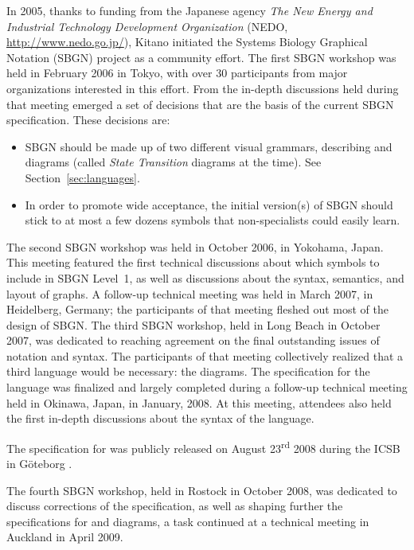 In 2005, thanks to funding from the Japanese agency \emph{The New Energy and Industrial Technology Development Organization} (NEDO, \url{http://www.nedo.go.jp/}), Kitano initiated the Systems Biology Graphical Notation (SBGN) project as a community effort.  The first SBGN workshop was held in February 2006 in Tokyo, with over 30 participants from major organizations interested in this effort.  From the in-depth discussions held during that meeting emerged a set of decisions that are the basis of the current SBGN specification.  These decisions are:

\begin{itemize}

\item SBGN should be made up of two different visual grammars, describing \ER{} and \PD{} diagrams (called \emph{State Transition} diagrams at the time).  See Section~\vref{sec:languages}.

\item In order to promote wide acceptance, the initial version(s) of SBGN should stick to at most a few dozens symbols that non-specialists could easily learn.

\end{itemize}

The second SBGN workshop was held in October 2006, in Yokohama, Japan.  This meeting featured the first technical discussions about which symbols to include in SBGN Level~1, as well as discussions about the syntax, semantics, and layout of graphs.  A follow-up technical meeting was held in March 2007, in Heidelberg, Germany; the participants of that meeting fleshed out most of the design of SBGN.  The third SBGN workshop, held in Long Beach in October 2007, was dedicated to reaching agreement on the final outstanding issues of notation and syntax.  The participants of that meeting collectively realized that a third language would be necessary: the \AF diagrams.  The specification for the \PD language was finalized and largely completed during a follow-up technical meeting held in Okinawa, Japan, in January, 2008.  At this meeting, attendees also held the first in-depth discussions about the syntax of the \ER language. 

The specification for \SBGNPDLone was publicly released on August 23\textsuperscript{rd} 2008 during the ICSB in G\"oteborg \cite{Lenov:2008}.

The fourth SBGN workshop, held in Rostock in October 2008, was dedicated to discuss corrections of the \SBGNPDLone specification, as well as shaping further the specifications for \ER and \AF diagrams, a task continued at a technical meeting in Auckland in April 2009. 

